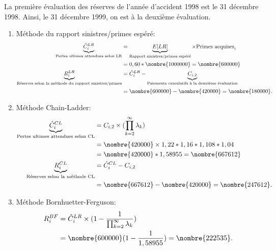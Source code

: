 \begin{exemple}
  La première évaluation des réserves de l'année d'accident 1998 est
  le 31 décembre 1998. Ainsi, le 31 décembre 1999, on est à la
  deuxième évaluation.
  \begin{enumerate}
  \item Méthode du rapport sinistres/primes espéré:
    \begin{align*}
      \underbrace{\hat{C}_{i}^{LR}}_{\text{Pertes ultimes attendues selon LR}} &=
                                                                                 \underbrace{\Esp{LR}}_{\text{Rapport sinistres/primes espéré}} \times \text{Primes acquises}_i\\
                                                                               &= 0,60 * \nombre{1000000} = \nombre{600000} \\
      \underbrace{R_i^{LR}}_{\text{Réserves selon la méthode du rapport sinistres/primes}}
                                                                               &= \hat{C}_{i}^{LR} - \underbrace{C_{i, 2}}_{\text{Paiements cumulatifs à la deuxième évaluation}} \\
                                                                               &= \nombre{600000} - \nombre{420000} = \nombre{180000}.
    \end{align*}
  \item Méthode Chain-Ladder:
    \begin{align*}
      \underbrace{\hat{C}_{i}^{CL}}_{\text{Pertes ultimes attendues selon CL}} &=
                                                                                 C_{i, 2} \times (\prod_{k=2}^{\infty} \lambda_k)\\
                                                                               &= \nombre{420000} \times 1,22 * 1,16 * 1,108 * 1,04 \\
                                                                               &= \nombre{420000} * 1,58955 = \nombre{667612}\\
      \underbrace{R_i^{CL}}_{\text{Réserves selon la méthode CL}}
                                                                               &= \hat{C}_{i}^{CL} - C_{i, 2} \\
                                                                               &= \nombre{667612} - \nombre{420000} = \nombre{247612}.
    \end{align*}
  \item Méthode Bornhuetter-Ferguson:
    \begin{align*}
      R_i^{BF} &= \hat{C}_{i}^{LR} \times ( 1 - \frac{1}{\prod_{k=2}^{\infty} \lambda_k}) \\
               &= \nombre{600000} (1-\frac{1}{1,58955}) = \nombre{222535}.
    \end{align*}


\end{enumerate}
\end{exemple}

